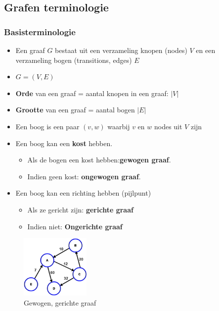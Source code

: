 \documentclass{article}
\begin{document}
\subsection{Grafen terminologie}

\subsubsection{Basisterminologie}

\begin{itemize}
    \item Een graaf $G$ bestaat uit een verzameling knopen (nodes) $V$ en een verzameling bogen (transitions, edges) $E$ 
    \item $G = (V, E)$
    \item \textbf{Orde} van een graaf = aantal knopen in een graaf: $|V|$
    \item \textbf{Grootte} van een graaf = aantal bogen $|E|$
    \item Een boog is een paar $(v,w)$ waarbij $v$ en $w$ nodes uit $V$ zijn
    \item Een boog kan een \textbf{kost} hebben. 
    \begin{itemize}
        \item Als de bogen een kost hebben:\textbf{gewogen graaf}. 
        \item Indien geen kost: \textbf{ongewogen graaf}.
    \end{itemize}    
    \item Een boog kan een richting hebben (pijlpunt)
    \begin{itemize}
        \item Als ze gericht zijn: \textbf{gerichte graaf}
        \item Indien niet: \textbf{Ongerichte graaf}
    \end{itemize}
\end{itemize}

\begin{figure}[H]
    \centering
    \includegraphics[width=0.3\textwidth]{gerichte-graaf.png}
    \caption{Gewogen, gerichte graaf}
\end{figure}
\end{document}

